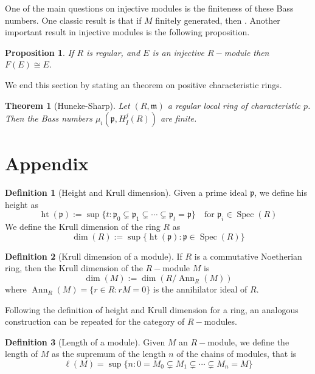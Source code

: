 \documentclass[leqno]{article}
\newtheorem{theorem}{Theorem}[section]
\newtheorem{proposition}{Proposition}[section]
\theoremstyle{definition}
\newtheorem{definition}{Definition}[section]
\DeclareMathOperator{\heigth}{ht}
\DeclareMathOperator{\Spec}{Spec}
\DeclareMathOperator{\Ann}{Ann}
\begin{document}
One of the main questions on injective modules is the finiteness of these Bass numbers. One classic result is that if $M$ finitely generated, then . Another important result in injective modules is the following proposition.

 \begin{proposition} If $R$ is regular, and $E$ is an injective $R-$module then $F(E)\cong E$.
\end{proposition}

We end this section by stating an theorem on positive characteristic rings.

\begin{theorem}[Huneke-Sharp] Let $(R, \mathfrak{m})$ a regular local ring of characteristic $p$. Then the Bass numbers $\mu_{i}(\mathfrak{p}, H_I^j(R))$ are finite.
\end{theorem}






\section{Appendix}

\begin{definition}[Height and Krull dimension] Given a prime ideal $\mathfrak{p}$, we define his height as
  \[
	\heigth (\mathfrak{p}) := \sup \{t: \mathfrak{p}_0 \subsetneq \mathfrak{p}_1 \subsetneq \cdots \subsetneq  \mathfrak{p}_t = \mathfrak{p} \} \quad \text{for } \mathfrak{p}_i\in \Spec(R)
  \]
We define the Krull dimension of the ring $R$ as
 \[
 \dim (R) :=  \sup \{\heigth (\mathfrak{p}) : \mathfrak{p}\in \Spec(R)\}
\] 
\end{definition}

\begin{definition}[Krull dimension of a module] If  $R$ is a commutative Noetherian ring, then the Krull dimension of the  $R-$module  $M$ is
   \[
\dim(M) := \dim (R / \Ann _R(M))
  \] 
  where $\Ann_R(M) = \{r \in R : rM = 0\}$ is the annihilator ideal of $R$.
\end{definition}

Following the definition of height and Krull dimension for a ring, an analogous construction can be repeated for the category of $R-$modules.

\begin{definition}[Length of a module] Given $M$ an $R-$module, we define the length of  $M$ as the supremum of the length $n$ of the chains of modules, that is
  \[
	\ell(M)= \sup \{n: 0 = M_0\subsetneq M_1 \subsetneq \cdots \subsetneq M_n = M\}
  \] 
\end{definition}
\end{document}
